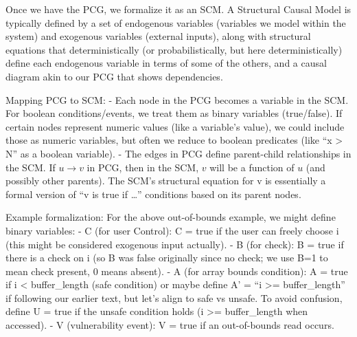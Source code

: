 \documentclass[conference,compsoc]{IEEEtran}
\begin{document}
Once we have the PCG, we formalize it as an SCM. A Structural Causal
Model is typically defined by a set of endogenous variables (variables
we model within the system) and exogenous variables (external inputs),
along with structural equations that deterministically (or
probabilistically, but here deterministically) define each endogenous
variable in terms of some of the others, and a causal diagram akin to
our PCG that shows dependencies.

Mapping PCG to SCM: - Each node in the PCG becomes a variable in the
SCM. For boolean conditions/events, we treat them as binary variables
(true/false). If certain nodes represent numeric values (like a
variable's value), we could include those as numeric variables, but
often we reduce to boolean predicates (like ``x \textgreater{} N'' as a
boolean variable). - The edges in PCG define parent-child relationships
in the SCM. If \(u \rightarrow v\) in PCG, then in the SCM, \(v\) will be a function of \(u\)
(and possibly other parents). The SCM's structural equation for v is
essentially a formal version of ``v is true if \ldots'' conditions based
on its parent nodes.

Example formalization: For the above out-of-bounds example, we might
define binary variables: - C (for user Control): C = true if the user
can freely choose i (this might be considered exogenous input actually).
- B (for check): B = true if there is a check on i (so B was false
originally since no check; we use B=1 to mean check present, 0 means
absent). - A (for array bounds condition): A = true if i \textless{}
buffer\_length (safe condition) or maybe define A' = ``i \textgreater=
buffer\_length'' if following our earlier text, but let's align to safe
vs unsafe. To avoid confusion, define U = true if the unsafe condition
holds (i \textgreater= buffer\_length when accessed). - V (vulnerability
event): V = true if an out-of-bounds read occurs.
\end{document}
